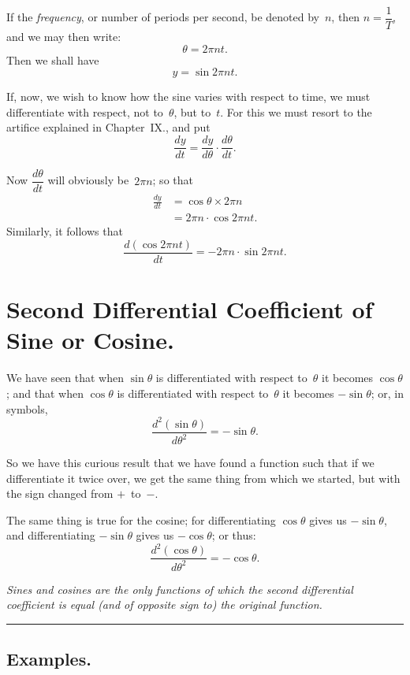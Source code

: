 \documentclass[12pt,openany]{book}%
\begin{document}
If the \emph{frequency}, or number of periods per second, be denoted by~$n$,
then $n = \dfrac{1}{T}$, and we may then write:
\[
\theta=2\pi nt.
\]
Then we shall have
\[
y = \sin2\pi nt.
\]


If, now, we wish to know how the sine varies with respect to time, we must
differentiate with respect, not to~$\theta$, but to~$t$. For this we must
resort to the artifice explained in Chapter~IX., and put
\[
\frac{dy}{dt} = \frac{dy}{d\theta} \cdot\frac{d\theta}{dt}.
\]


Now $\dfrac{d\theta}{dt}$ will obviously be~$2\pi n$; so that
\begin{align*}
\frac{dy}{dt}  &  =\cos\theta\times2\pi n\\
&  =2\pi n\cdot\cos2\pi nt.
\end{align*}
Similarly, it follows that%
\[
\frac{d(\cos2\pi nt)}{dt}=-2\pi n\cdot\sin2\pi nt.
\]


\section*{Second Differential Coefficient of Sine or Cosine.}

We have seen that when $\sin\theta$ is differentiated with respect to~$\theta$
it becomes $\cos\theta$; and that when $\cos\theta$ is differentiated with
respect to~$\theta$ it becomes $-\sin\theta$; or, in symbols,
\[
\frac{d^{2}(\sin\theta)}{d\theta^{2}} = -\sin\theta.
\]


So we have this curious result that we have found a function such that if we
differentiate it twice over, we get the same thing from which we started, but
with the sign changed from $+$~to~$-$.

The same thing is true for the cosine; for differentiating $\cos\theta$ gives
us $-\sin\theta$, and differentiating $-\sin\theta$ gives us $-\cos\theta$; or
thus:
\[
\frac{d^{2}(\cos\theta)}{d\theta^{2}} = -\cos\theta.
\]


\emph{Sines and cosines are the only functions of which the second
differential coefficient is equal \emph{(and of opposite sign to)} the
original function.}

\begin{center}
\rule{1.5in}{0.5pt}
\end{center}

\subsection*{Examples.}
\end{document}
